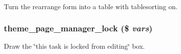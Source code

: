\label{page__manager_8theme_8inc_a5f6d18d0708a8144666d23523e2a85e1}
Turn the rearrange form into a table with tablesorting on. \hypertarget{page__manager_8theme_8inc_a8bf60472dc388c02c9102d5fe989a48e}{
\subsubsection[{theme\_\-page\_\-manager\_\-lock}]{\setlength{\rightskip}{0pt plus 5cm}theme\_\-page\_\-manager\_\-lock (\$ {\em vars})}}
\label{page__manager_8theme_8inc_a8bf60472dc388c02c9102d5fe989a48e}
Draw the \char`\"{}this task is locked from editing\char`\"{} box. 